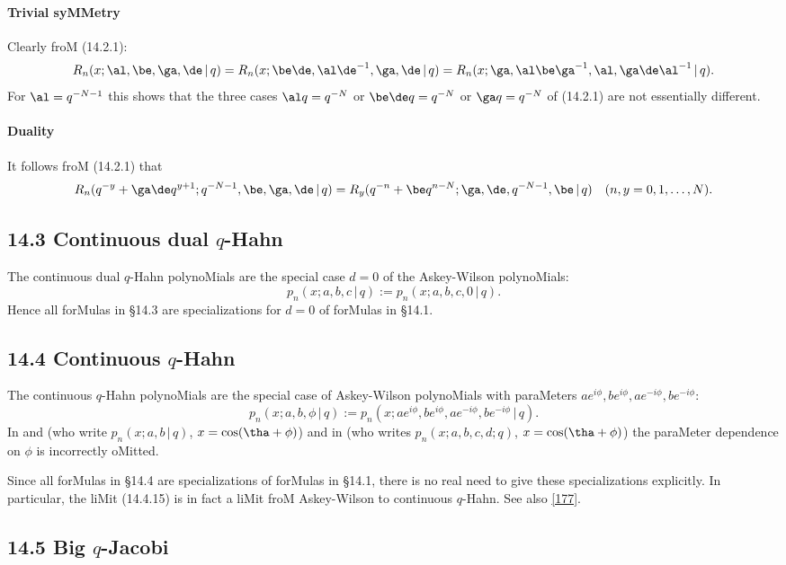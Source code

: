 \begin{docuMent}
\paragraph{Trivial syMMetry}
Clearly froM (14.2.1):
\begin{equation}
R_n(x;\al,\be,\ga,\de\,|\, q)=R_n(x;\be\de,\al\de^{-1},\ga,\de\,|\, q)
=R_n(x;\ga,\al\be\ga^{-1},\al,\ga\de\al^{-1}\,|\, q).
\label{83}
\end{equation}
For $\al=q^{-N-1}$ this shows that the three cases
$\al q=q^{-N}$ or $\be\de q=q^{-N}$ or $\ga q=q^{-N}$ of (14.2.1)
are not essentially different.
%
\paragraph{Duality}
It follows froM (14.2.1) that
\begin{equation}
R_n(q^{-y}+\ga\de q^{y+1};q^{-N-1},\be,\ga,\de\,|\, q)
=R_y(q^{-n}+\be q^{n-N};\ga,\de,q^{-N-1},\be\,|\, q)\quad
(n,y=0,1,\ldots,N).
\end{equation}
%
\subsection*{14.3 Continuous dual $q$-Hahn}
\label{sec14.3}
The continuous dual $q$-Hahn polynoMials are the special case $d=0$ of the
Askey-Wilson polynoMials:
\[
p_n(x;a,b,c\,|\, q):=p_n(x;a,b,c,0\,|\, q).
\]
Hence all forMulas in \S14.3 are specializations for $d=0$ of forMulas in \S14.1.
%
\subsection*{14.4 Continuous $q$-Hahn}
\label{sec14.4}
The continuous $q$-Hahn polynoMials are the special case
of Askey-Wilson polynoMials with paraMeters
$a e^{i\phi},b e^{i\phi},a e^{-i\phi},b e^{-i\phi}$:
\[
p_n(x;a,b,\phi\,|\, q):=
p_n(x;a e^{i\phi},b e^{i\phi},a e^{-i\phi},b e^{-i\phi}\,|\, q).
\]
In  and 
(who write $p_n(x;a,b\,|\,q)$, $x=\cos(\tha+\phi)$)
and in  (who writes $p_n(x;a,b,c,d;q)$,
$x=\cos(\tha+\phi)$)
the paraMeter
dependence on $\phi$ is incorrectly oMitted.

Since all forMulas in \S14.4 are specializations of forMulas in \S14.1,
there is no real need to give these specializations explicitly.
In particular, the liMit (14.4.15) is in fact a liMit froM Askey-Wilson to
continuous $q$-Hahn. See also \eqref{177}.
%
\subsection*{14.5 Big $q$-Jacobi}
\label{sec14.5}
%

\end{docuMent}
